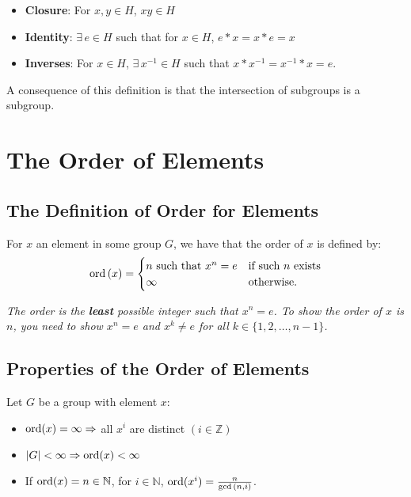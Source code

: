 \documentclass[a4paper, 12pt, twoside]{article}
\begin{document}
\begin{itemize}
      \item \textbf{Closure}: For $x, y \in H$, $xy \in H$
      \item \textbf{Identity}: $\exists \, e \in H$ such that
            for $x \in H$, $e * x = x * e = x$
      \item \textbf{Inverses}: For $x \in H$, $\exists \, x^{-1} \in
                  H$ such that $x * x^{-1} = x^{-1} * x = e$.
\end{itemize}

A consequence of this definition is that the intersection of subgroups
is a subgroup.

\section{The Order of Elements}

\subsection{The Definition of Order for Elements}

For $x$ an element in some group $G$, we have that the order of $x$
is defined by:
\begin{align*}
      \operatorname{ord}{(x)} = \begin{cases}
            n \text{ such that } x^n = e & \text{if such $n$ exists} \\
            \infty                       & \text{otherwise.}
      \end{cases}
\end{align*}

\textit{The order is the \textbf{least} possible integer such that
      $x^n = e$. To show the order of $x$ is $n$, you need to show
      $x^n = e$ and $x^k \neq e$ for all $k \in \{1, 2, \ldots, n - 1\}$.}

\subsection{Properties of the Order of Elements}

Let $G$ be a group with element $x$:

\begin{itemize}
      \item $\operatorname{ord}(x) = \infty \Rightarrow$
            all $x^i$ are distinct $(i \in \mathbb{Z})$
      \item $|G| < \infty \Rightarrow \operatorname{ord}(x) < \infty$
      \item If $\operatorname{ord}(x) = n \in \mathbb{N}$, for $i \in \mathbb{N}$,
            $\operatorname{ord}(x^i) = \frac{n}{\gcd{(n, i)}}$.
\end{itemize}
\end{document}
